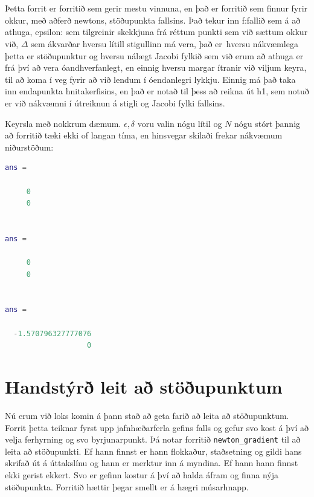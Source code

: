 \documentclass[a4]{article}
\begin{document}
\section{}
Þetta forrit er forritið sem gerir mestu vinnuna, en það er forritið sem finnur fyrir okkur, með aðferð newtons, stöðupunkta fallsins. Það tekur inn
f:fallið sem á að athuga,
epsilon: sem tilgreinir skekkjuna frá réttum punkti sem við sættum okkur við,
$\Delta$ sem ákvarðar hversu lítill stigullinn má vera, það er\ hversu nákvæmlega þetta er stöðupunktur
og hversu nálægt Jacobi fylkið sem við erum að athuga er frá því að vera óandhverfanlegt,
en einnig hversu margar ítranir við viljum keyra, til að koma í veg fyrir að við lendum í óendanlegri lykkju.
Einnig má það taka inn endapunkta hnitakerfisins, en það er notað til þess að reikna út h1, sem notuð er  við nákvæmni í útreiknun á stigli og Jacobi fylki fallsins.



Keyrsla með nokkrum dæmum. $\epsilon, \delta$ voru valin nógu lítil og $N$ nógu stórt þannig að forritið tæki ekki of langan tíma, en hinsvegar skilaði frekar nákvæmum niðurstöðum:


\begin{lstlisting}[language=Matlab]
ans =

     0
     0


ans =

     0
     0


ans =

  -1.570796327777076
                   0

\end{lstlisting}


\section{Handstýrð leit að stöðupunktum}

Nú erum við loks komin á þann stað að geta farið að leita að stöðupunktum. Forrit þetta teiknar fyrst upp jafnhæðarferla gefins falls og gefur svo kost á því að velja ferhyrning og svo byrjunarpunkt. Þá notar forritið \lstinline{newton_gradient} til að leita að stöðupunkti. Ef hann finnst er hann flokkaður, staðsetning og gildi hans skrifað út á úttakslínu og hann er merktur inn á myndina. Ef hann hann finnst ekki gerist ekkert. Svo er gefinn kostur á því að halda áfram og finna nýja stöðupunkta. Forritið hættir þegar smellt er á hægri músarhnapp.
\end{document}
